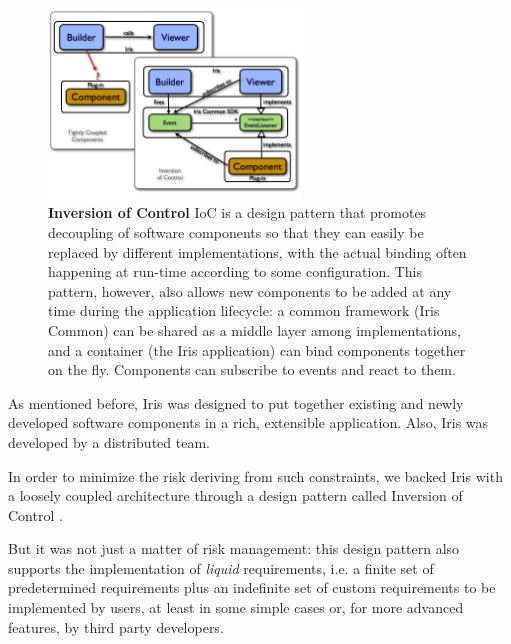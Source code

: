 \documentclass[final,5p,authoryear]{elsarticle}
\begin{document}
\begin{figure} \begin{center}
\includegraphics[width=0.6\textwidth]{figures/IrisDiagrams.003.png}
\caption{\textbf{Inversion of Control} IoC is a design pattern that promotes
decoupling of software components so that they can easily be replaced by
different implementations, with the actual binding often happening at run-time
according to some configuration. This pattern, however, also allows new
components to be added at any time during the application lifecycle: a common
framework (Iris Common) can be shared as a middle layer among implementations,
and a container (the Iris application) can bind components together on the fly.
Components can subscribe to events and react to them.} \label{fig:ioc}
\end{center} \end{figure}

As mentioned before, Iris was designed to put together existing and newly
developed software components in a rich, extensible application. Also, Iris was
developed by a distributed team.

In order to minimize the risk deriving from such constraints, we backed Iris
with a loosely coupled architecture through a design pattern called Inversion of
Control \citep*{ioc}.

But it was not just a matter of risk management: this design pattern also
supports the implementation of \emph{liquid} requirements, i.e. a finite set of
predetermined requirements plus an indefinite set of custom requirements to be
implemented by users, at least in some simple cases or, for more advanced
features, by third party developers.
\end{document}
